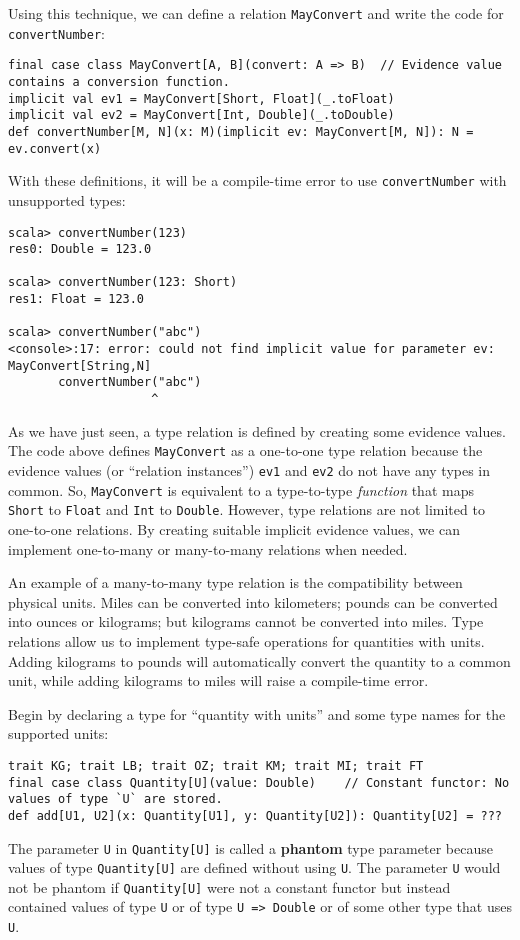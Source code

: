 Using this technique, we can define a relation \lstinline!MayConvert!
and write the code for \lstinline!convertNumber!:
\begin{lstlisting}
final case class MayConvert[A, B](convert: A => B)  // Evidence value contains a conversion function.
implicit val ev1 = MayConvert[Short, Float](_.toFloat)
implicit val ev2 = MayConvert[Int, Double](_.toDouble)
def convertNumber[M, N](x: M)(implicit ev: MayConvert[M, N]): N = ev.convert(x)
\end{lstlisting}
With these definitions, it will be a compile-time error to use \lstinline!convertNumber!
with unsupported types:
\begin{lstlisting}
scala> convertNumber(123)
res0: Double = 123.0

scala> convertNumber(123: Short)
res1: Float = 123.0

scala> convertNumber("abc")
<console>:17: error: could not find implicit value for parameter ev: MayConvert[String,N]
       convertNumber("abc")
                    ^
\end{lstlisting}

As we have just seen, a type relation is defined by creating some
evidence values. The code above defines \lstinline!MayConvert! as
a one-to-one type relation because the evidence values (or \textsf{``}relation
instances\textsf{''}) \lstinline!ev1! and \lstinline!ev2! do not have any
types in common. So, \lstinline!MayConvert! is equivalent to a type-to-type
\emph{function} that maps \lstinline!Short! to \lstinline!Float!
and \lstinline!Int! to \lstinline!Double!. However, type relations
are not limited to one-to-one relations. By creating suitable implicit
evidence values, we can implement one-to-many or many-to-many relations
when needed. 

An example of a many-to-many type
relation is the compatibility between physical units. Miles can be
converted into kilometers; pounds can be converted into ounces or
kilograms; but kilograms cannot be converted into miles. Type relations
allow us to implement type-safe operations for quantities with units.
Adding kilograms to pounds will automatically convert the quantity
to a common unit, while adding kilograms to miles will raise a compile-time
error.

Begin by declaring a type for \textsf{``}quantity with units\textsf{''} and some type
names for the supported units:
\begin{lstlisting}
trait KG; trait LB; trait OZ; trait KM; trait MI; trait FT
final case class Quantity[U](value: Double)    // Constant functor: No values of type `U` are stored.
def add[U1, U2](x: Quantity[U1], y: Quantity[U2]): Quantity[U2] = ???
\end{lstlisting}
The parameter \lstinline!U! in \lstinline!Quantity[U]! is called
a \textbf{phantom} type parameter because
values of type \lstinline!Quantity[U]! are defined without using
\lstinline!U!. The parameter \lstinline!U! would not be phantom
if \lstinline!Quantity[U]! were not a constant functor
but instead contained values  of type \lstinline!U! or of type \lstinline!U => Double!
or of some other type that uses \lstinline!U!. 

